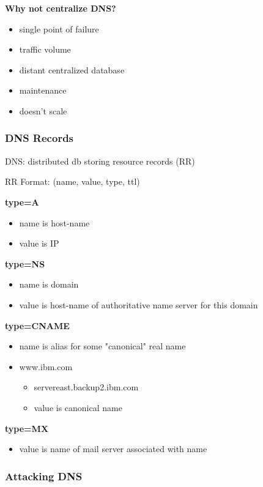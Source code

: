 \documentclass[11pt]{article}
\begin{document}
\textbf{Why not centralize DNS?}
\begin{itemize}
\item single point of failure
\item traffic volume
\item distant centralized database
\item maintenance
\item doesn't scale
\end{itemize}

\subsubsection{DNS Records}
\label{sec:org45d1be8}

DNS: distributed db storing resource records (RR) 

RR Format: (name, value, type, ttl)

\textbf{type=A}
\begin{itemize}
\item name is host-name
\item value is IP
\end{itemize}

\textbf{type=NS}
\begin{itemize}
\item name is domain
\item value is host-name of authoritative name server for this domain
\end{itemize}

\textbf{type=CNAME}
\begin{itemize}
\item name is alias for some "canonical" real name
\item www.ibm.com
\begin{itemize}
\item servereast.backup2.ibm.com
\item value is canonical name
\end{itemize}
\end{itemize}

\textbf{type=MX}
\begin{itemize}
\item value is name of mail server associated with name
\end{itemize}


\subsubsection{Attacking DNS}
\label{sec:org8a3f683}
\end{document}
